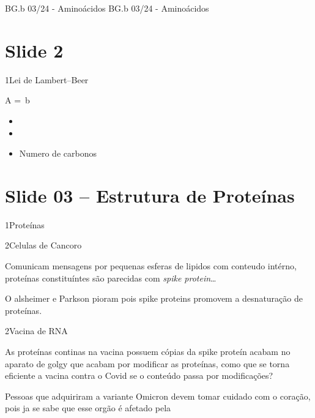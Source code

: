\documentclass[\mainfilename]{subfiles}
\begin{document}
{BG.b 03/24 - Aminoácidos}
{BG.b 03/24 - Aminoácidos}

\section*{Slide 2}

\begin{sectionBox}1{Lei de Lambert--Beer}

    \begin{BM}
        A = \varepsilon\,b\,\ch{[C]}
    \end{BM}

    \begin{multicols}{2}
        \begin{itemize}
            \item[\(\varepsilon\)]  
            \item[\textit{b}]       
            \item[\ch{[C]}]         Numero de carbonos
        \end{itemize}
    \end{multicols}

\end{sectionBox}

\section*{Slide 03 -- Estrutura de Proteínas}

\begin{sectionBox}1{Proteínas}
    
    
    
\end{sectionBox}

\begin{sectionBox}2{Celulas de Cancoro}
    
    Comunicam mensagens por pequenas esferas de lipidos com conteudo intérno, proteínas constituíntes são parecidas com \textit{spike protein}\dots

    O alsheimer e Parkson pioram pois spike proteins promovem a desnaturação de proteínas.
    
\end{sectionBox}

\begin{sectionBox}2{Vacina de RNA}
    
    As proteínas continas na vacina possuem cópias da spike proteín acabam no aparato de golgy que acabam por modificar as proteínas, como que se torna eficiente a vacina contra o Covid se o conteúdo passa por modificações?

    Pessoas que adquiriram a variante Omicron devem tomar cuidado com o coração, pois ja se sabe que esse orgão é afetado pela
    
\end{sectionBox}
\end{document}
